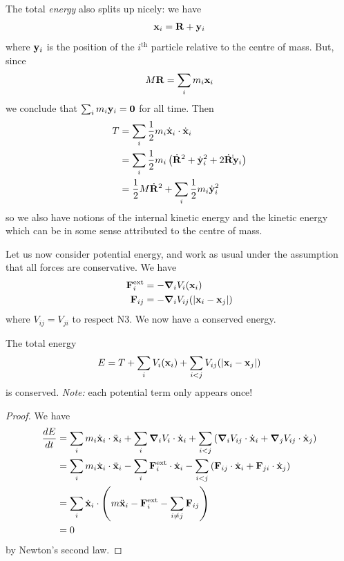 \documentclass{../template/note}
\begin{document}
    The total \emph{energy} also splits up nicely: we have
    \begin{align*}
        \V x_i = \V R + \V y_i
    \end{align*}
    where \(\V y_i\) is the position of the \(i^\text{th}\) particle relative to the centre of mass. But, since
    \begin{align}
        M\V R = \sum_i m_i \V x_i
    \end{align}
    we conclude that \(\sum_i m_i \V y_i = \V 0\) for all time. Then
    \begin{align}
        T &= \sum_i \frac 1 2 m_i \dot{\V x}_i \cdot \dot{\V x}_i \\
        &= \sum_i \frac 1 2 m_i \left(\dot{\V R}^2 + \dot{\V y}_i^2 + 2 \dot{\V R} \dot \dot{\V y}_i\right) \\
        &= \frac 1 2 M \dot{\V R}^2 + \sum_i \frac 1 2 m_i \dot{\V y}_i^2
    \end{align}
    so we also have notions of the internal kinetic energy and the kinetic energy which can be in some sense attributed to the centre of mass.

    Let us now consider potential energy, and work as usual under the assumption that all forces are conservative. We have
    \begin{align*}
        \V F_i^\text{ext} &= -\grad_i V_i(\V x_i) \\
        \V F_{ij} &= -\grad_i V_{ij}(|\V x_i - \V x_j|)
    \end{align*}
    where \(V_{ij} = V_{ji}\) to respect N3. We now have a conserved energy.

    \begin{proposition}
        The total energy
        \begin{align*}
            E = T + \sum_i V_i(\V x_i) + \sum_{i < j} V_{ij} (|\V x_i - \V x_j|)
        \end{align*}
        is conserved. \emph{Note:} each potential term only appears once!        
    \end{proposition}
    
    \begin{proof}
        We have
        \begin{align*}
            \frac{dE}{dt} &= \sum_i m_i \dot{\V x}_i \cdot \ddot{\V x}_i + \sum_i \grad_i V_i \cdot \dot{\V x}_i + \sum_{i < j}\left(\grad_i V_{ij} \cdot \dot{\V x}_i + \grad_j V_{ij} \cdot \dot{\V x}_j\right) \\
            &= \sum_i m_i \dot{\V x}_i \cdot \ddot{\V x}_i - \sum_i \V F_i^\text{ext} \cdot \dot{\V x}_i - \sum_{i < j} \left(\V F_{ij} \cdot \dot{\V x}_i + \V F_{ji} \cdot \dot{\V x}_j\right) \\
            &= \sum_i \dot{\V x}_i \cdot \left(m \ddot{\V x}_i - \V F_i^\text{ext} - \sum_{i \neq j} \V F_{ij} \right) \\
            &= 0
        \end{align*}
        by Newton's second law.
    \end{proof}
    
\end{document}

